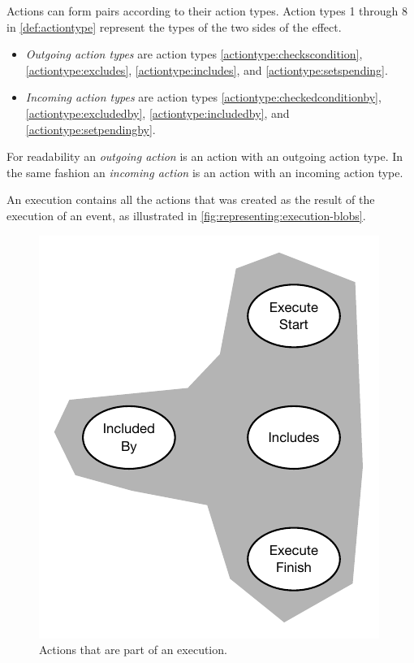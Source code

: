     \newpar	Actions can form pairs according to their action types. Action types 1 through 8 in \autoref{def:actiontype} represent the types of the two sides of the effect.
	
	\begin{itemize}
		\item \textit{Outgoing action types} are action types \ref{actiontype:checkscondition}, \ref{actiontype:excludes}, \ref{actiontype:includes}, and \ref{actiontype:setspending}.
		\item \textit{Incoming action types} are action types \ref{actiontype:checkedconditionby}, \ref{actiontype:excludedby}, \ref{actiontype:includedby}, and \ref{actiontype:setpendingby}. 
	\end{itemize}
    
    \noindent For readability an \textit{outgoing action} is an action with an outgoing action type. In the same fashion an \textit{incoming action} is an action with an incoming action type.
    
    \newpar An execution contains all the actions that was created as the result of the execution of an event, as illustrated in \autoref{fig:representing:execution-blobs}.
    
    \begin{figure}[H]
		\centering
		\includegraphics[height=0.35\textheight]{3local/images/execution-blobs.pdf}
		\caption{Actions that are part of an execution.}
		\label{fig:representing:execution-blobs}
	\end{figure}
    
